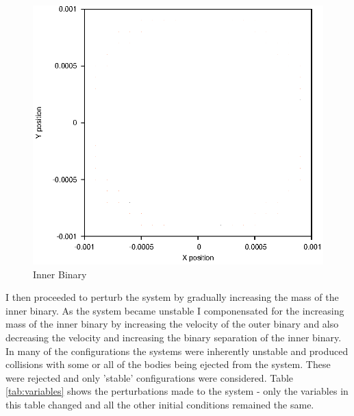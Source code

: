 \documentclass[a4paper,12pt]{article}
\begin{document}
\begin{figure}[H]
\centering
\includegraphics[width=.9\textwidth]{./results/innerbinary/Orbit.eps}
\caption{Inner Binary}
\label{fig:innerbinary}
\end{figure}
I then proceeded to perturb the system by gradually increasing the mass of the inner binary. As the system became unstable I componensated for
the increasing mass of the inner binary by increasing the velocity of the outer binary and also decreasing the velocity and increasing the binary 
separation of the inner binary. In many of the configurations the systems were inherently unstable and produced collisions with some 
or all of the bodies being ejected from the system. These were rejected and only 'stable' configurations were considered.
Table \ref{tab:variables} shows the perturbations made to the system - only the variables in this table changed and all the other initial
conditions remained the same.
\end{document}
